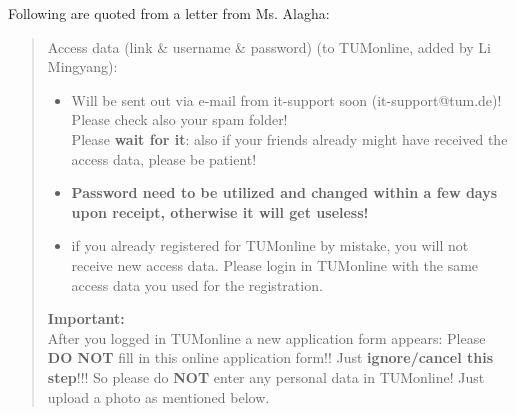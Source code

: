 \documentclass[final]{book}
\begin{document}
Following are quoted from a letter from Ms. Alagha:
\begin{quotation}
Access data (link \& username \& password) {\color{gray}(to TUMonline, added by Li Mingyang)}:
\begin{itemize}
\renewcommand\labelitemi{--}  %
\item Will be sent out via e-mail from it-support soon (it-support@tum.de)!
Please check also your spam folder!\\
Please \textbf{wait for it}: also if your friends already might have received the access data, please be patient!
\item \textbf{Password need to be {\color{blue}utilized and changed within a few days upon receipt}, otherwise it will get useless!}
\item if you already registered for TUMonline by mistake, you will not receive new access data. Please login in TUMonline with the same access data you used for the registration.
\end{itemize}
 
\textbf{Important:}\\
After you logged in TUMonline a new application form appears: Please \textbf{DO NOT} fill in this online application form!! Just \textbf{\color{blue}ignore/cancel this step}!!! So please do \textbf{NOT} enter any personal data in TUMonline! Just upload a photo as mentioned below.
\end{quotation}
\end{document}
